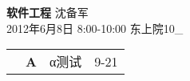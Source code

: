 \documentclass[twocolumn]{article}
\begin{document}
{\bf 软件工程} 沈备军 \\
2012年6月8日 8:00-10:00 东上院10\_ \\ 
\begin{tabular}{ | >{\bfseries}m{0.5em} | >{\bfseries}m{1em} | m{12em} | m{8em} |} \cline{1-4}
\multirow{51}{0.5em}{- \newline  \newline  \newline  \newline  \newline - \newline  \newline  \newline  \newline  \newline - \newline  \newline  \newline  \newline  \newline - \newline  \newline  \newline  \newline  \newline - \newline  \newline  \newline  \newline  \newline - \newline  \newline  \newline  \newline  \newline - \newline  \newline  \newline  \newline  \newline - \newline  \newline  \newline  \newline  \newline - \newline  \newline  \newline  \newline  \newline - \newline  \newline  \newline  \newline  \newline -} & Α & α测试 & 9-21\\ \cline{2-4}

\end{tabular}
\end{document}
